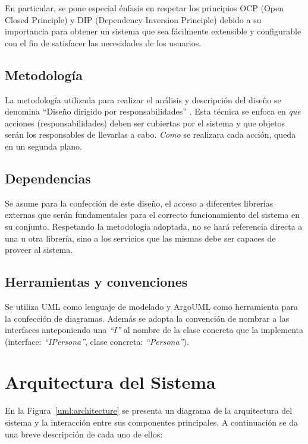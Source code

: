 \documentclass[a4paper,10pt]{article}
\begin{document}
  En particular, se pone especial \'enfasis en respetar los principios OCP
(Open Closed Principle) y DIP (Dependency Inversion Principle) debido a su
importancia para obtener un sistema que sea f\'acilmente extensible y
configurable con el fin de satisfacer las necesidades de los usuarios.
  
  \subsection{Metodolog\'ia}
  La metodolog\'ia utilizada para realizar el an\'alisis y descripci\'on del
dise\~no se denomina ``Dise\~no dirigido por responsabilidades''
\cite{wirfsbrok03}. Esta t\'ecnica se enfoca en \textit{que} acciones
(responsabilidades) deben ser cubiertas por el sistema y que objetos ser\'an los
responsables de llevarlas a cabo. \textit{Como} se realizara cada acci\'on,
queda en un segunda plano.

  \subsection{Dependencias}
  Se asume para la confecci\'on de este dise\~no, el acceso a diferentes
librer\'ias externas que ser\'an fundamentales para el correcto funcionamiento
del sistema en su conjunto.
  Respetando la metodolog\'ia adoptada, no se har\'a referencia directa a una u
otra librer\'ia, sino a los servicios que las mismas debe ser capaces de proveer
al sistema.

  \subsection{Herramientas y convenciones}
  Se utiliza UML\cite{uml} como lenguaje de modelado y ArgoUML\cite{argoUML}
como herramienta para la confecci\'on de diagramas. Adem\'as se adopta la
convenci\'on de nombrar a las interfaces anteponiendo una \textit{``I''} al
nombre de la clase concreta que la implementa (interface:
\textit{``IPersona''}, clase concreta: \textit{``Persona''}).

\section{Arquitectura del Sistema}
  \label{architecture}
  En la Figura~\ref{uml:architecture} se presenta un diagrama de la
arquitectura del sistema y la interacci\'on entre sus componentes principales.
A continuaci\'on se da una breve descripci\'on de cada uno de ellos:
\end{document}
